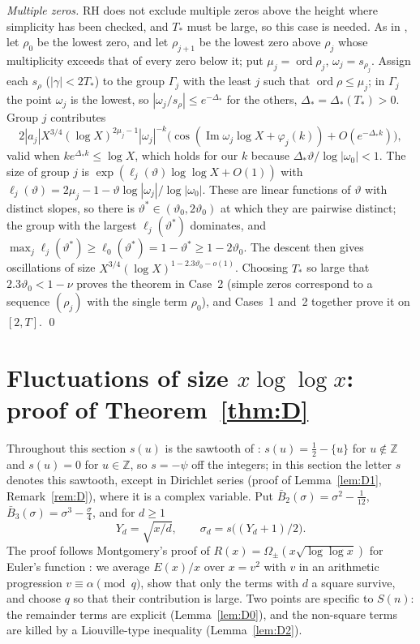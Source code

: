 \documentclass[11pt]{amsart}
\theoremstyle{remark}
\begin{document}
\emph{Multiple zeros.} RH does not exclude multiple zeros above the height where simplicity has been checked, and $T_*$ must be large, so this case is needed. As in \cite[(5.10)]{KW09}, let $\rho_0$ be the lowest zero, and let $\rho_{j+1}$ be the lowest zero above $\rho_j$ whose multiplicity exceeds that of every zero below it; put $\mu_j=\operatorname{ord}\rho_j$, $\omega_j=s_{\rho_j}$. Assign each $s_\rho$ ($|\gamma|<2T_*$) to the group $\Gamma_j$ with the least $j$ such that $\operatorname{ord}\rho\le\mu_j$; in $\Gamma_j$ the point $\omega_j$ is the lowest, so $|\omega_j/s_\rho|\le e^{-\Delta_*}$ for the others, $\Delta_*=\Delta_*(T_*)>0$. Group $j$ contributes
\[
2|a_j|X^{3/4}(\log X)^{2\mu_j-1}|\omega_j|^{-k}\big(\cos(\operatorname{Im}\omega_j\log X+\varphi_j(k))+O(e^{-\Delta_* k})\big),
\]
valid when $ke^{\Delta_* k}\le\log X$, which holds for our $k$ because $\Delta_*\vartheta/\log|\omega_0|<1$. The size of group $j$ is $\exp(\ell_j(\vartheta)\log\log X+O(1))$ with $\ell_j(\vartheta)=2\mu_j-1-\vartheta\log|\omega_j|/\log|\omega_0|$. These are linear functions of $\vartheta$ with distinct slopes, so there is $\vartheta^*\in(\vartheta_0,2\vartheta_0)$ at which they are pairwise distinct; the group with the largest $\ell_j(\vartheta^*)$ dominates, and $\max_j\ell_j(\vartheta^*)\ge\ell_0(\vartheta^*)=1-\vartheta^*\ge1-2\vartheta_0$. The descent then gives oscillations of size $X^{3/4}(\log X)^{1-2.3\vartheta_0-o(1)}$. Choosing $T_*$ so large that $2.3\vartheta_0<1-\nu$ proves the theorem in Case~2 (simple zeros correspond to a sequence $(\rho_j)$ with the single term $\rho_0$), and Cases~1 and~2 together prove it on $[2,T]$. \qed

\section{Fluctuations of size \texorpdfstring{$x\log\log x$}{x log log x}: proof of Theorem~\ref{thm:D}}\label{sec:D}

Throughout this section $s(u)$ is the sawtooth of \cite{Mo}: $s(u)=\tfrac12-\{u\}$ for $u\notin\mathbb Z$ and $s(u)=0$ for $u\in\mathbb Z$, so $s=-\psi$ off the integers; in this section the letter $s$ denotes this sawtooth, except in Dirichlet series (proof of Lemma~\ref{lem:D1}, Remark~\ref{rem:D}), where it is a complex variable. Put $\bar B_2(\sigma)=\sigma^2-\frac1{12}$, $\bar B_3(\sigma)=\sigma^3-\frac\sigma4$, and for $d\ge1$
\[
Y_d=\sqrt{x/d},\qquad \sigma_d=s\big((Y_d+1)/2\big).
\]
The proof follows Montgomery's proof of $R(x)=\Omega_\pm(x\sqrt{\log\log x})$ for Euler's function \cite{Mo}: we average $E(x)/x$ over $x=v^2$ with $v$ in an arithmetic progression $v\equiv\alpha\pmod q$, show that only the terms with $d$ a square survive, and choose $q$ so that their contribution is large. Two points are specific to $S(n)$: the remainder terms are explicit (Lemma~\ref{lem:D0}), and the non-square terms are killed by a Liouville-type inequality (Lemma~\ref{lem:D2}).
\end{document}
